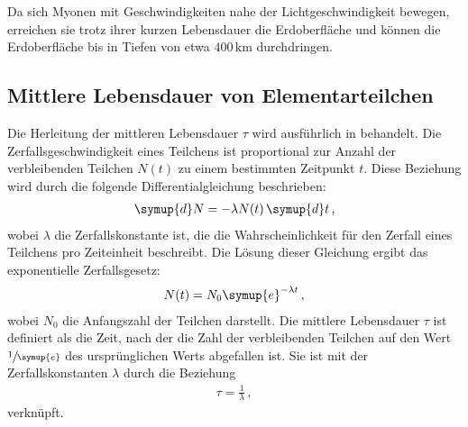 Da sich Myonen mit Geschwindigkeiten nahe der Lichtgeschwindigkeit bewegen, erreichen sie trotz ihrer kurzen Lebensdauer die Erdoberfläche 
und können die Erdoberfläche bis in Tiefen von etwa $400\,\unit{\kilo\meter}$ durchdringen.

\subsection{Mittlere Lebensdauer von Elementarteilchen}
Die Herleitung der mittleren Lebensdauer $\tau$ wird ausführlich in \cite{Techniques} behandelt. Die Zerfallsgeschwindigkeit eines Teilchens 
ist proportional zur Anzahl der verbleibenden Teilchen $N(t)$ zu einem bestimmten Zeitpunkt $t$. Diese Beziehung wird durch die folgende 
Differentialgleichung beschrieben:
\begin{align}
\symup{d}N = -\lambda N(t)\,\symup{d}t \,, %
\end{align}
wobei $\lambda$ die Zerfallskonstante ist, die die Wahrscheinlichkeit für den Zerfall eines Teilchens pro Zeiteinheit beschreibt. 
Die Lösung dieser Gleichung ergibt das exponentielle Zerfallsgesetz:
\begin{align}
N(t) = N_0 \symup{e}^{-\lambda t} \,, \label{eqn:Zerfallsgesetz}
\end{align}
wobei $N_0$ die Anfangszahl der Teilchen darstellt. Die mittlere Lebensdauer $\tau$ ist definiert als die Zeit, nach der die Zahl der 
verbleibenden Teilchen auf den Wert $\sfrac{1}{\symup{e}}$ des ursprünglichen Werts abgefallen ist. Sie ist mit der Zerfallskonstanten $\lambda$ durch die Beziehung
\begin{align}
\tau = \frac{1}{\lambda}\,, \label{eqn:tau}
\end{align}
verknüpft.

